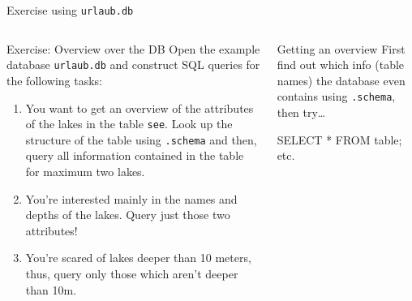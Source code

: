 \begin{frame}[fragile]{Exercise using \texttt{urlaub.db}}
\begin{columns}
      \begin{exampleblock}{Exercise: Overview over the DB}\footnotesize
Open the example database \texttt{urlaub.db} and construct SQL queries for the following tasks: 
        \begin{enumerate}\scriptsize
    \item You want to get an overview of the attributes of the lakes in the table \texttt{see}. Look up the structure of the table using \texttt{.schema} and then, query all information contained in the table for maximum two lakes.  
    \item You're interested mainly in the names and depths of the lakes. Query just those two attributes!
    \item You're scared of lakes deeper than 10 meters, thus, query only those which aren't deeper than 10m. 
\end{enumerate}
      \end{exampleblock}
    \begin{block}{Getting an overview}\small
    First find out which info (table names) the database even contains using \texttt{.schema}, then try\dots
    \begin{sqlcode}
    SELECT * FROM table; 
    etc.
    \end{sqlcode}
\end{block}

\end{columns}
\end{frame}


